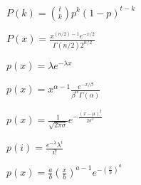 \documentclass{article}
\begin{document}
$\displaystyle P(k) = {t \choose k}p^k(1-p)^{t-k}$
\pagebreak

$\displaystyle P(x) = \frac{x^{(n/2)-1}e^{-x/2}}{\Gamma(n/2)2^{n/2}}$
\pagebreak

$\displaystyle p(x) = \lambda e^{-\lambda x}$
\pagebreak

$\displaystyle p(x) = x^{\alpha-1}\frac{e^{-x/\beta}}{\beta^\alpha\Gamma(\alpha)}$
\pagebreak

$\displaystyle p(x) = \frac{1}{\sqrt{2\pi\sigma}} e^{-\frac{(x-\mu)^2}{2\sigma^2}} $
\pagebreak

$p(i) = \frac{e^{-\lambda}\lambda^i}{i!}$
\pagebreak

$\displaystyle p(x) = \frac{a}{b}\left(\frac{x}{b}\right)^{a-1}e^{-\left(\frac{x}{b}\right)^a}$
\pagebreak
\end{document}
